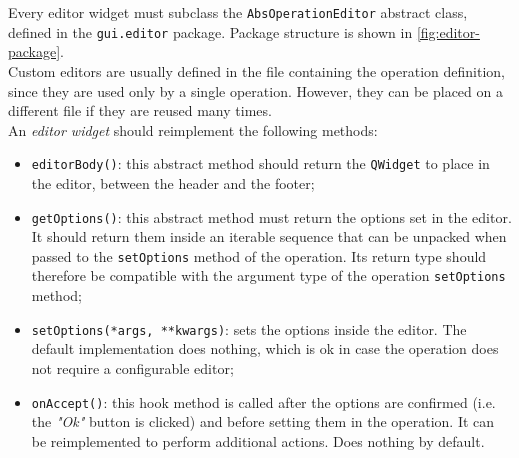 Every editor widget must subclass the \texttt{AbsOperationEditor} abstract class, defined in the \texttt{gui.editor} package. Package structure is shown in \cref{fig:editor-package}.\\
Custom editors are usually defined in the file containing the operation definition, since they are used only by a single operation. However, they can be placed on a different file if they are reused many times.\\
An \textit{editor widget} should reimplement the following methods:
\begin{itemize}
	\item \texttt{editorBody()}: this abstract method should return the \texttt{QWidget} to place in the editor, between the header and the footer;
	\item \texttt{getOptions()}: this abstract method must return the options set in the editor. It should return them inside an iterable sequence that can be unpacked when passed to the \texttt{setOptions} method of the operation. Its return type should therefore be compatible with the argument type of the operation \texttt{setOptions} method;
	\item \texttt{setOptions(*args, **kwargs)}: sets the options inside the editor. The default implementation does nothing, which is ok in case the operation does not require a configurable editor;
	\item \texttt{onAccept()}: this hook method is called after the options are confirmed (i.e. the \textit{"Ok"} button is clicked) and before setting them in the operation. It can be reimplemented to perform additional actions. Does nothing by default.
\end{itemize}

